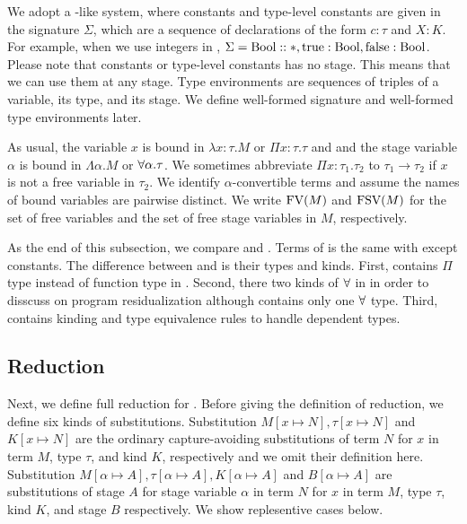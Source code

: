 
We adopt a \LLF-like system, where constants and type-level constants are given in the signature $\Sigma$, which
are a sequence of declarations of the form $c:\tau$ and $X:K$.
For example, when we use integers in \LMD, $\Sigma = \textrm{Bool} :: *, \textrm{true}:\textrm{Bool}, \textrm{false}:\textrm{Bool}$.
Please note that constants or type-level constants has no stage.
This means that we can use them at any stage.
Type environments are sequences of triples of a variable, its type, and its stage.
We define well-formed signature and well-formed type environments later.

As usual, the variable $x$ is bound in $\lambda x:\tau.M$ or $\Pi x:\tau.\tau$ and
and the stage variable $\alpha$ is bound in $\Lambda \alpha.M$ or $\forall\alpha.\tau$.
We sometimes abbreviate $\Pi x:\tau_1.\tau_2$ to $\tau_1 \rightarrow \tau_2$ if
$x$ is not a free variable in $\tau_2$.
We identify $\alpha$-convertible terms and assume the names of bound variables are pairwise distinct.
We write $\text{FV}(M)$ and $\text{FSV}(M)$ for the set of free variables and the set of free stage variables in $M$, respectively.

	

As the end of this subsection, we compare \LMD and \LTP.
Terms of \LMD is the same with \LTP except constants.
The difference between \LMD and \LTP is their types and kinds.
First, \LMD contains $\Pi$ type instead of function type in \LTP.
Second, there two kinds of $\forall$ in \LTP in order to disscuss on program residualization
although \LMD contains only one $\forall$ type.
Third, \LMD contains kinding and type equivalence rules to handle dependent types.

\subsection{Reduction}

Next, we define full reduction for \LMD.
Before giving the definition of reduction, we define six kinds of substitutions.
Substitution $M[x\mapsto N], \tau[x \mapsto N]$ and $K[x \mapsto N]$ are 
the ordinary capture-avoiding substitutions of
term $N$ for $x$ in term $M$, type $\tau$, and kind $K$, respectively
and we omit their definition here.
Substitution $M[\alpha \mapsto A], \tau [\alpha \mapsto A], K[\alpha \mapsto A]$ and $B[\alpha\mapsto A]$ are 
substitutions of stage $A$ for stage variable $\alpha$ in 
term $N$ for $x$ in term $M$, type $\tau$, kind $K$, and stage $B$ respectively.
We show replesentive cases below.

